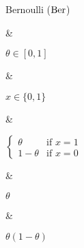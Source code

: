 Bernoulli ($\operatorname{Ber}$)

&

$\theta \in [0, 1]$

& 

$x \in \{0, 1\}$

&

\(\displaystyle
	\begin{cases}
		\theta 		& \text{if } x = 1 \\
		1 - \theta	& \text{if } x = 0
	\end{cases}
\)

&

$\theta$

&

$\theta (1 - \theta)$